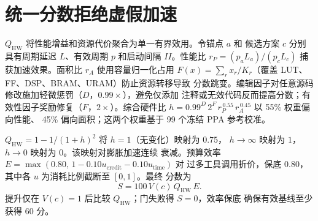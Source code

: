 \section{统一分数拒绝虚假加速}

$Q_{\mathrm{HW}}$ 将性能增益和资源代价聚合为单一有界效用。令锚点 $a$ 和
候选方案 $c$ 分别具有周期延迟 $L$、有效周期 $p$ 和启动间隔 $II$。性能比
$r_P = (p_a L_a)/(p_c L_c)$ 捕获加速效果。面积比 $r_A$ 使用容量归一化占用
$F(x)=\sum_{r} x_r/K_r$（覆盖 LUT、FF、DSP、BRAM、URAM）防止资源转移导致
分数跳变。编辑因子对任意源码修改施加轻微惩罚（$D$，$0.99{\times}$），避免仅添加
注释或无效代码反而提高分数；有效性因子奖励修复（$F$，$2{\times}$）。综合硬件比
$h = 0.99^{D}\,2^{F}\,r_P^{\,0.55}\,r_A^{\,0.45}$ 以 55\% 权重偏向性能、
45\% 偏向面积；这两个权重基于 99 个冻结 PPA 参考校准。

$Q_{\mathrm{HW}} = 1-1/(1+h)^2$ 将 $h{=}1$（无变化）映射为 $0.75$，
$h{\to}\infty$ 映射为 $1$，$h{\to}0$ 映射为 $0$。该映射对膨胀加速连续
衰减。预算效率 $E = \max(0.80,\,1-0.10u_{\mathrm{credit}}-0.10u_{\mathrm{time}})$ 对
过多工具调用折价，保底 $0.80$，其中各 $u$ 为消耗比例截断至 $[0,1]$。最终
分数为
\begin{equation}
S = 100\,V(c)\,Q_{\mathrm{HW}}\,E.
\label{eq:score}
\end{equation}
提升仅在 $V(c){=}1$ 后比较 $Q_{\mathrm{HW}}$；门失败得 $S{=}0$，效率保底
确保有效基线至少获得 $60$ 分。
